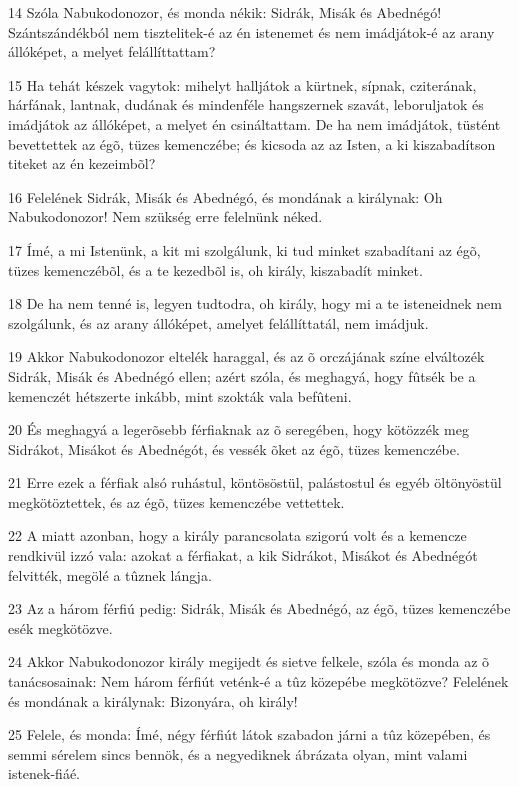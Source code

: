 \par 14 Szóla Nabukodonozor, és monda nékik: Sidrák, Misák és Abednégó! Szántszándékból nem tisztelitek-é az én istenemet és nem imádjátok-é az arany állóképet, a melyet felállíttattam?
\par 15 Ha tehát készek vagytok: mihelyt halljátok a kürtnek, sípnak, cziterának, hárfának, lantnak, dudának és mindenféle hangszernek szavát, leboruljatok és imádjátok az állóképet, a melyet én csináltattam. De ha nem imádjátok, tüstént bevettettek az égõ, tüzes kemenczébe; és kicsoda az az Isten, a ki kiszabadítson titeket az én kezeimbõl?
\par 16 Felelének Sidrák, Misák és Abednégó, és mondának a királynak: Oh Nabukodonozor! Nem szükség erre felelnünk néked.
\par 17 Ímé, a mi Istenünk, a kit mi szolgálunk, ki tud minket szabadítani az égõ, tüzes kemenczébõl, és a te kezedbõl is, oh király, kiszabadít minket.
\par 18 De ha nem tenné is, legyen tudtodra, oh király, hogy mi a te isteneidnek nem szolgálunk, és az arany állóképet, amelyet felállíttatál, nem imádjuk.
\par 19 Akkor Nabukodonozor eltelék haraggal, és az õ orczájának színe elváltozék Sidrák, Misák és Abednégó ellen; azért szóla, és meghagyá, hogy fûtsék be a kemenczét hétszerte inkább, mint szokták vala befûteni.
\par 20 És meghagyá a legerõsebb férfiaknak az õ seregében, hogy kötözzék meg Sidrákot, Misákot és Abednégót, és vessék õket az égõ, tüzes kemenczébe.
\par 21 Erre ezek a férfiak alsó ruhástul, köntösöstül, palástostul és egyéb öltönyöstül megkötöztettek, és az égõ, tüzes kemenczébe vettettek.
\par 22 A miatt azonban, hogy a király parancsolata szigorú volt és a kemencze rendkivül izzó vala: azokat a férfiakat, a kik Sidrákot, Misákot és Abednégót felvitték, megölé a tûznek lángja.
\par 23 Az a három férfiú pedig: Sidrák, Misák és Abednégó, az égõ, tüzes kemenczébe esék megkötözve.
\par 24 Akkor Nabukodonozor király megijedt és sietve felkele, szóla és monda az õ tanácsosainak: Nem három férfiút veténk-é a tûz közepébe megkötözve? Felelének és mondának a királynak: Bizonyára, oh király!
\par 25 Felele, és monda: Ímé, négy férfiút látok szabadon járni a tûz közepében, és semmi sérelem sincs bennök, és a negyediknek ábrázata olyan, mint valami istenek-fiáé.
